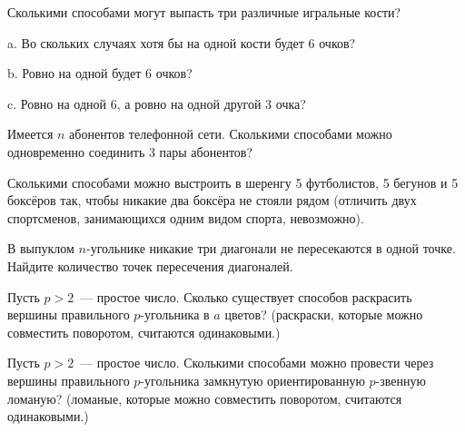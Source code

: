 \begin{problems}
\item Сколькими способами могут выпасть три различные игральные кости?

a. Во скольких случаях хотя бы на одной кости будет 6 очков?

b. Ровно на одной будет 6 очков?

c. Ровно на одной 6, а ровно на одной другой 3 очка?

\item Имеется $n$ абонентов телефонной сети. Сколькими способами можно одновременно соединить 3 пары абонентов?

\item Сколькими способами можно выстроить в шеренгу 5 футболистов, 5 бегунов и 5 боксёров так, чтобы никакие два боксёра не стояли рядом (отличить двух спортсменов, занимающихся одним видом спорта, невозможно).

\item В выпуклом $n$-угольнике никакие три диагонали не пересекаются в одной
точке. Найдите количество точек пересечения диагоналей.

\item Пусть $p>2$~--- простое число. Сколько существует способов раскрасить вершины правильного $p$-угольника в $a$ цветов? (раскраски, которые можно совместить поворотом, считаются одинаковыми.) 

\item Пусть $p>2$~--- простое число. Сколькими способами можно провести через вершины правильного $p$-угольника замкнутую ориентированную $p$-звенную ломаную? (ломаные, которые можно совместить поворотом, считаются одинаковыми.) 

\end{problems}
